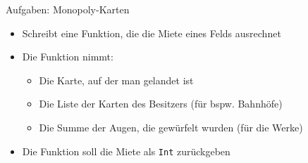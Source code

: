 \documentclass{beamer}
\newcommand{\code}[1]{
	\begin{mdframed}
		
	\end{mdframed}
}
\begin{document}
\begin{frame}{Aufgaben: Monopoly-Karten}
	\code{demos/MonopolyRent.hs}

	\begin{itemize}
		\item Schreibt eine Funktion, die die Miete eines Felds ausrechnet
		\item Die Funktion nimmt:
		\begin{itemize}
			\item Die Karte, auf der man gelandet ist
			\item Die Liste der Karten des Besitzers (für bspw. Bahnhöfe)
			\item Die Summe der Augen, die gewürfelt wurden (für die Werke)
		\end{itemize}
		\item Die Funktion soll die Miete als \texttt{Int} zurückgeben
	\end{itemize}
\end{frame}
\end{document}
